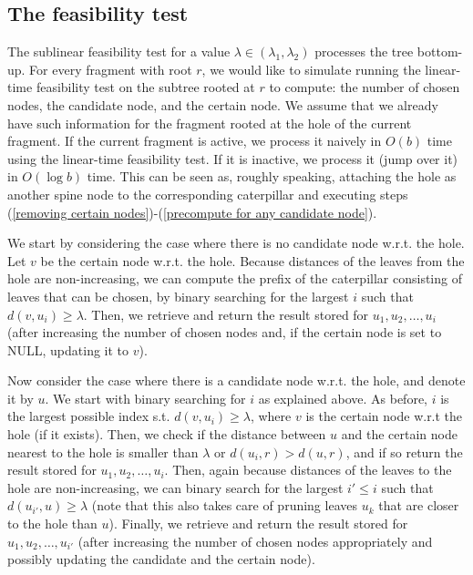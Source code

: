 \documentclass[11pt,a4paper]{article}
\theoremstyle{definition}
\theoremstyle{remark}
\begin{document}
\subsection{The feasibility test}
\label{sec:feasibility test}

The sublinear feasibility test for a value $\lambda \in (\lambda_1,\lambda_2)$ processes the tree bottom-up. For every fragment with root $r$, we would like to simulate running the
linear-time feasibility test on the subtree rooted at $r$ to compute: the number of chosen nodes, the candidate node, and the certain
node. We assume that we already have such information for the fragment rooted at the hole of the current fragment.
If the current fragment is active, we process it naively in $O(b)$ time
using the linear-time feasibility test. If it is inactive, we process it (jump over it) in $O(\log b)$ time.
This can be seen as, roughly speaking, attaching the hole as another spine node to the corresponding caterpillar and executing steps
(\ref{removing certain nodes})-(\ref{precompute for any candidate node}).

We start by considering the case where there is no candidate node w.r.t. the hole. Let $v$ be the certain node w.r.t. the hole.
Because distances of the leaves from the hole are non-increasing,  we can compute the prefix of the caterpillar consisting of
leaves that can be chosen, by binary searching for the largest $i$ such that $d(v,u_{i})\geq \lambda$. Then, we retrieve and return the result
stored for $u_{1},u_{2},\ldots,u_{i}$ (after increasing the number of chosen nodes and, if the certain node is set to NULL, updating it to $v$).

Now consider the case where there is a candidate node w.r.t. the hole, and denote it by $u$. We start with binary searching for $i$ as explained above. As before, $i$ is the largest possible index s.t. $d(v,u_{i})\geq \lambda$, where $v$ is the certain node w.r.t the hole (if it exists). Then,
we check if the distance between $u$ and the certain node nearest to the hole is smaller than $\lambda$ or
$d(u_{i},r)>d(u,r)$, and if so return the result stored for $u_{1},u_{2},\ldots,u_{i}$. Then, again because distances of the leaves
to the hole are non-increasing, we can binary search for the largest $i'\leq i$ such that $d(u_{i'},u)\geq \lambda$
(note that this also takes care of pruning leaves $u_{k}$ that are closer to the hole than $u$).
Finally, we retrieve and return the result stored for $u_{1},u_{2},\ldots,u_{i'}$ (after increasing the number of chosen nodes appropriately and possibly updating the candidate and the certain node).
\end{document}
